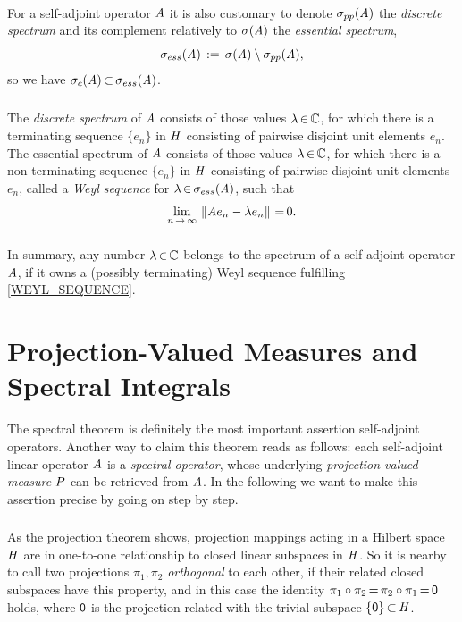 \documentclass[11pt,twoside]{article}
\begin{document}
\paragraph*{}
For a self-adjoint operator $\mathit{A}$
it is also customary to denote $\sigma_{pp}(\mathit{A})$ 
the \textit{discrete spectrum} 
and its complement relatively to
$\sigma(\mathit{A})$ the \textit{essential spectrum}, {\ie}
\[
\sigma_{ess}(\mathit{A}) \,:=\,
\sigma(\mathit{A}) \setminus \sigma_{pp}(\mathit{A}),
\]
so we have $\sigma_c(\mathit{A}) {\,\subset\,} \sigma_{ess}(\mathit{A})$.

\subparagraph*{}
The \textit{discrete spectrum} of $\mathit{A}$ consists
of those values $\lambda {\,\in\,} {\mathbb{C}}$,
for which there is a terminating sequence $\{e_n\}$ in $\mathit{H}$
consisting of pairwise disjoint unit elements $e_n$.
The essential spectrum of $\mathit{A}$ consists of those values $\lambda {\,\in\,} {\mathbb{C}}$,
for which there is a non-terminating sequence $\{e_n\}$ in $\mathit{H}$
consisting of pairwise disjoint unit elements $e_n$,
called a \textit{Weyl sequence} for $\lambda {\,\in\,} \sigma_{ess}(\mathit{A})$,
such that
\begin{equation}\label{WEYL_SEQUENCE}
\lim_{n {\,\to\,} \infty} \, \left\lVert \mathit{A} e_n - \lambda e_n \right\rVert {\,=\,} 0.
\end{equation}

\subparagraph*{}
In summary,
any number $\lambda {\,\in\,} {\mathbb{C}}$ belongs
to the spectrum of a self-adjoint operator $\mathit{A}$,
if it owns a (possibly terminating) Weyl sequence
fulfilling \eqref{WEYL_SEQUENCE}.

\section{Projection-Valued Measures and Spectral Integrals}
The {spectral theorem} is definitely the most important assertion
{\wrt} self-adjoint operators.
Another way to claim this theorem reads as follows:
each self-adjoint linear operator $\mathit{A}$ is a \textit{spectral operator},
whose underlying \textit{projection-valued measure} ${P}$
can be retrieved from $\mathit{A}$.
In the following we want to make this assertion precise
by going on step by step.

\subsubsection*{} %
As the projection theorem shows,
projection mappings acting in a Hilbert space $\mathit{H}$
are in one-to-one relationship to closed linear subspaces in $\mathit{H}$.
So it is nearby
to call two projections $\pi_1,\pi_2$ \textit{orthogonal} to each other,
if their related closed subspaces have this property,
and in this case the identity
$\pi_1 \circ \pi_2 {\,=\,} \pi_2 \circ \pi_1 {\,=\,} {\mathsf{0}}$ holds,
where ${\mathsf{0}}$ is the projection related
with the trivial subspace $\{{\mathsf{0}}\} {\,\subset\,} \mathit{H}$.
\end{document}
